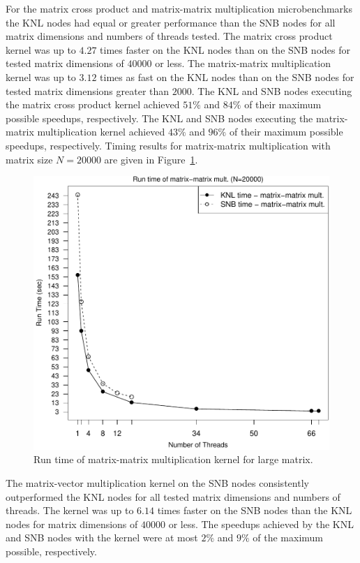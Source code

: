 For the matrix cross product and matrix-matrix multiplication microbenchmarks the KNL
nodes had equal or greater performance than the SNB nodes for all matrix dimensions and
numbers of threads tested. The matrix cross product kernel was up to $4.27$ times faster
on the KNL nodes than on the SNB nodes for tested matrix dimensions of $40000$ or less.
The matrix-matrix multiplication kernel was up to $3.12$ times as fast on the KNL nodes
than on the SNB nodes for tested matrix dimensions greater than $2000$. The KNL and SNB
nodes executing the matrix cross product kernel achieved $51\%$ and $84\%$ of their
maximum possible speedups, respectively. The KNL and SNB nodes executing the matrix-matrix
multiplication kernel achieved $43\%$ and $96\%$ of their maximum possible speedups,
respectively. Timing results for matrix-matrix multiplication with matrix size $N=20000$
are given in Figure~\ref{fig:largeMatmatTime}.

\begin{figure}
\includegraphics[height=\columnwidth, width=\columnwidth]{matmat_20000_68-rt.pdf}
\caption{Run time of matrix-matrix multiplication kernel for large matrix.}
\label{fig:largeMatmatTime}
\end{figure}

The matrix-vector multiplication kernel on the SNB nodes consistently outperformed the KNL
nodes for all tested matrix dimensions and numbers of threads. The kernel was up to $6.14$
times faster on the SNB nodes than the KNL nodes for matrix dimensions of $40000$ or less.
The speedups achieved by the KNL and SNB nodes with the kernel were at most $2\%$ and
$9\%$ of the maximum possible, respectively.

